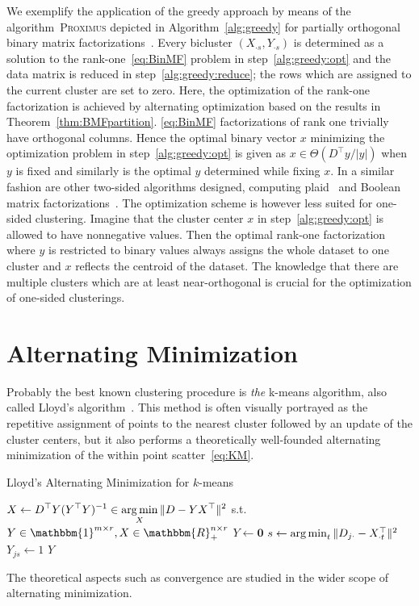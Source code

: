 We exemplify the application of the greedy approach by means of the algorithm~\textsc{Proximus} depicted in Algorithm~\ref{alg:greedy} for partially orthogonal binary matrix factorizations~\citep{koyuturk2003proximus}. Every bicluster $(X_{\cdot s},Y_{\cdot s})$ is determined as a solution to the rank-one~\ref{eq:BinMF} problem in step~\ref{alg:greedy:opt} and the data matrix is reduced in step~\ref{alg:greedy:reduce}; the rows which are assigned to the current cluster are set to zero. Here, the optimization of the rank-one factorization is achieved by alternating optimization based on the results in Theorem~\ref{thm:BMFpartition}. \ref{eq:BinMF} factorizations of rank one trivially have orthogonal columns. Hence the optimal binary vector $x$ minimizing the optimization problem in step~\ref{alg:greedy:opt} is given as $x\in\Theta(D^\top y/|y|)$ when $y$ is fixed and similarly is the optimal $y$ determined while fixing $x$. In a similar fashion are other two-sided algorithms designed, computing plaid~\citep{cheng2000biclustering, lazzeroni2002plaid,turner2005improved} and Boolean matrix factorizations~\citep{miettinen2008discrete, geerts2004tiling}. The optimization scheme is however less suited for  one-sided clustering. Imagine that the cluster center $x$ in step~\ref{alg:greedy:opt} is allowed to have nonnegative values. Then the optimal rank-one factorization where $y$ is restricted to binary values always assigns the whole dataset to one cluster and $x$ reflects the centroid of the dataset. The knowledge that there are multiple clusters which are at least near-orthogonal is crucial for the optimization of one-sided clusterings.
\section{Alternating Minimization}\label{sec:ZS:Lloyds}
Probably the best known clustering procedure is \emph{the} k-means algorithm, also called Lloyd's algorithm~\citep{lloyd1982least}. This method is often visually portrayed as the repetitive assignment of points to the nearest cluster followed by an update of the cluster centers, but it also performs a theoretically well-founded alternating minimization of the within point scatter~\eqref{eq:KM}.
\begin{algorithm}[t]
\caption{Lloyd's Alternating Minimization for $k$-means} 
\begin{algorithmic}[1]
    \State $\displaystyle X \gets D^\top Y(Y^\top Y)^{-1} \in  \operatorname*{arg\,min}_{X}\|D-YX^\top\|^2$ s.t. $Y\in\mathbbm{1}^{m\times r},X\in\mathbbm{R}_+^{n\times r}$
    \State $Y\gets \mathbf{0}$
        \State $s\gets \operatorname*{arg\,min}_t\|D_{j\cdot}-X_{\cdot t}^\top\|^2$ \label{alg:lloyd:y}
        \State $Y_{js}\gets 1$
    \EndFor
\EndFor
  \State \Return $Y$
  \EndFunction
\end{algorithmic}
\label{alg:lloyd}
\end{algorithm}
The theoretical aspects such as convergence are studied in the wider scope of alternating minimization. 

